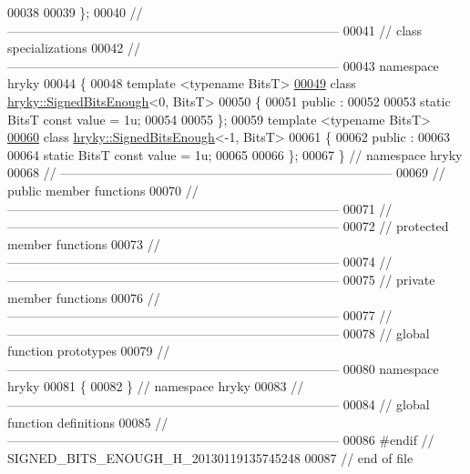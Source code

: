 \begin{DoxyCode}
00038 
00039 \};
00040 \textcolor{comment}{//
      ------------------------------------------------------------------------------}
00041 \textcolor{comment}{// class specializations}
00042 \textcolor{comment}{//
      ------------------------------------------------------------------------------}
00043 \textcolor{keyword}{namespace }hryky
00044 \{
00048 \textcolor{keyword}{template} <\textcolor{keyword}{typename} BitsT>
\hypertarget{signed__bits__enough_8h_source_l00049}{}\hyperlink{classhryky_1_1hryky_1_1_signed_bits_enough_3_010_00_01_bits_t_01_4}{00049} \textcolor{keyword}{class }\hyperlink{classhryky_1_1_signed_bits_enough}{hryky::SignedBitsEnough}<0, BitsT>
00050 \{
00051 \textcolor{keyword}{public} :
00052 
00053     \textcolor{keyword}{static} BitsT \textcolor{keyword}{const} value = 1u;
00054 
00055 \};
00059 \textcolor{keyword}{template} <\textcolor{keyword}{typename} BitsT>
\hypertarget{signed__bits__enough_8h_source_l00060}{}\hyperlink{classhryky_1_1hryky_1_1_signed_bits_enough_3-1_00_01_bits_t_01_4}{00060} \textcolor{keyword}{class }\hyperlink{classhryky_1_1_signed_bits_enough}{hryky::SignedBitsEnough}<-1, BitsT>
00061 \{
00062 \textcolor{keyword}{public} :
00063 
00064     \textcolor{keyword}{static} BitsT \textcolor{keyword}{const} value = 1u;
00065 
00066 \};
00067 \} \textcolor{comment}{// namespace hryky}
00068 \textcolor{comment}{//
      ------------------------------------------------------------------------------}
00069 \textcolor{comment}{// public member functions}
00070 \textcolor{comment}{//
      ------------------------------------------------------------------------------}
00071 \textcolor{comment}{//
      ------------------------------------------------------------------------------}
00072 \textcolor{comment}{// protected member functions}
00073 \textcolor{comment}{//
      ------------------------------------------------------------------------------}
00074 \textcolor{comment}{//
      ------------------------------------------------------------------------------}
00075 \textcolor{comment}{// private member functions}
00076 \textcolor{comment}{//
      ------------------------------------------------------------------------------}
00077 \textcolor{comment}{//
      ------------------------------------------------------------------------------}
00078 \textcolor{comment}{// global function prototypes}
00079 \textcolor{comment}{//
      ------------------------------------------------------------------------------}
00080 \textcolor{keyword}{namespace }hryky
00081 \{
00082 \} \textcolor{comment}{// namespace hryky}
00083 \textcolor{comment}{//
      ------------------------------------------------------------------------------}
00084 \textcolor{comment}{// global function definitions}
00085 \textcolor{comment}{//
      ------------------------------------------------------------------------------}
00086 \textcolor{preprocessor}{#endif // SIGNED\_BITS\_ENOUGH\_H\_20130119135745248}
00087 \textcolor{preprocessor}{}\textcolor{comment}{// end of file}
\end{DoxyCode}
